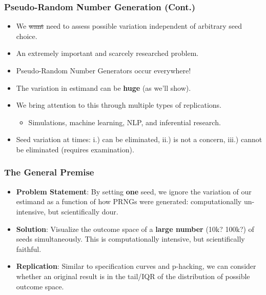 \documentclass[12pt]{beamer}
\begin{document}
\begin{frame}
\frametitle{Pseudo-Random Number Generation (Cont.)}
	\begin{itemize}
 		\item We \sout{want} need to assess possible variation independent of arbitrary seed choice.\vspace{.1in}\pause
		\item An extremely important and scarcely researched problem.\vspace{.1in}\pause
		\item Pseudo-Random Number Generators occur \color{myblue}everywhere\color{black}!\\ \vspace{.1in}\pause
		\item The variation in estimand can be \color{myblue} \textbf{huge} \color{black} (as we'll show).\\ \vspace{.1in}\pause
		\item We bring attention to this through multiple types of replications.\\ \vspace{.05in}
		\begin{itemize}
			\item Simulations, machine learning, NLP, and inferential research.\\ \vspace{.05in}
		\end{itemize}
		\item Seed variation at times: i.) can be eliminated, ii.) is not a concern, iii.) cannot be eliminated (requires examination).
	\end{itemize}
\end{frame}


\begin{frame}
\frametitle{The General Premise}
\begin{itemize}
\item \textbf{\color{myred}Problem Statement\color{black}}: By setting \textbf{one} seed, we ignore the variation of our estimand as a function of how PRNGs were generated: computationally un-intensive, but scientifically dour.\\ \pause \vspace{.2in}
\item \textbf{\color{myred}Solution\color{black}}: Visualize the outcome space of a \textbf{large number} (10k? 100k?) of seeds simultaneously. This is computationally intensive, but scientifically faithful.\\ \pause \vspace{.2in}
\item \textbf{\color{myred}Replication\color{black}}: Similar to specification curves and p-hacking, we can consider whether an original result is in the tail/IQR of the distribution of possible outcome space.
\end{itemize}
\end{frame}
\end{document}
